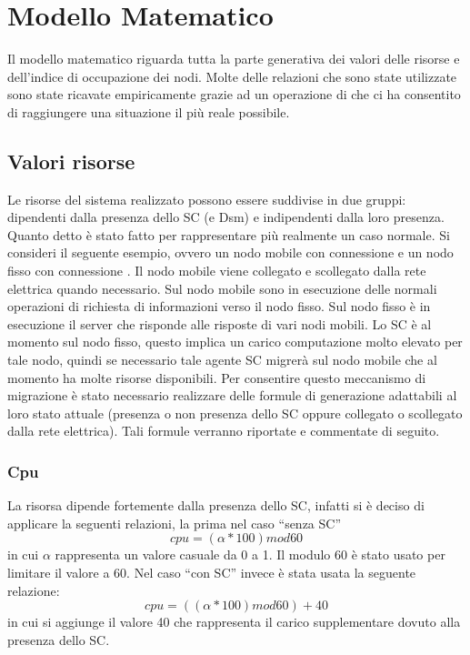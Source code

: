 \chapter{Modello Matematico}\label{cap:modello}
Il modello matematico riguarda tutta la parte generativa dei valori delle risorse e dell'indice di occupazione dei nodi. Molte delle relazioni che sono state utilizzate sono state ricavate empiricamente grazie ad un operazione di  che ci ha consentito di raggiungere una situazione il più reale possibile.
\section{Valori risorse}
Le risorse del sistema realizzato possono essere suddivise in due gruppi: dipendenti dalla presenza dello SC (e Dsm) e indipendenti dalla loro presenza. Quanto detto è stato fatto per rappresentare più realmente un caso normale. Si consideri il seguente esempio, ovvero un nodo mobile con connessione  e un nodo fisso con connessione . Il nodo mobile viene collegato e scollegato dalla rete elettrica quando necessario. Sul nodo mobile sono in esecuzione delle normali operazioni di richiesta di informazioni verso il nodo fisso. Sul nodo fisso è in esecuzione il server che risponde alle risposte di vari nodi mobili. Lo SC è al momento sul nodo fisso, questo implica un carico computazione molto elevato per tale nodo, quindi se necessario tale agente SC migrerà sul nodo mobile che al momento ha molte risorse disponibili. Per consentire questo meccanismo di migrazione è stato necessario realizzare delle formule di generazione adattabili al loro stato attuale (presenza o non presenza dello SC oppure collegato o scollegato dalla rete elettrica). Tali formule verranno riportate e commentate di seguito.
\subsection{Cpu}
La risorsa  dipende fortemente dalla presenza dello SC, infatti si è deciso di applicare la seguenti relazioni, la prima nel caso ``senza SC''
$$
cpu = (\alpha * 100) mod 60
$$
in cui $\alpha$ rappresenta un valore casuale da 0 a 1. Il modulo 60 è stato usato per limitare il valore a 60. Nel caso ``con SC'' invece è stata usata la seguente relazione:
$$
cpu = ((\alpha * 100) mod 60) + 40
$$
in cui si aggiunge il valore 40 che rappresenta il carico supplementare dovuto alla presenza dello SC.